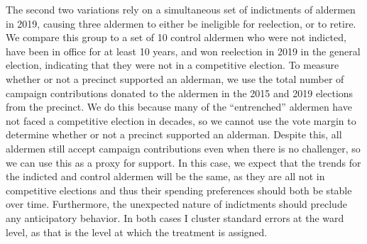The second two variations rely on a simultaneous set of indictments of aldermen in 2019, causing three aldermen to either be ineligible for reelection, or to retire. 
We compare this group to a set of 10 control aldermen who were not indicted, have been in office for at least 10 years, and won reelection in 2019 in the general election, indicating that they were not in a competitive election. 
To measure whether or not a precinct supported an alderman, we use the total number of campaign contributions donated to the aldermen in the 2015 and 2019 elections from the precinct.
We do this because many of the ``entrenched'' aldermen have not faced a competitive election in decades, so we cannot use the vote margin to determine whether or not a precinct supported an alderman.
Despite this, all aldermen still accept campaign contributions even when there is no challenger, so we can use this as a proxy for support.
In this case, we expect that the trends for the indicted and control aldermen will be the same, as they are all not in competitive elections and thus their spending preferences should both be stable over time.
Furthermore, the unexpected nature of indictments should preclude any anticipatory behavior.
In both cases I cluster standard errors at the ward level, as that is the level at which the treatment is assigned.
